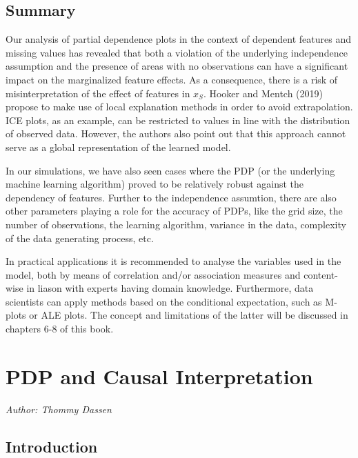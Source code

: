 \documentclass[
]{krantz}
\begin{document}
\hypertarget{summary}{%
\section{Summary}\label{summary}}

Our analysis of partial dependence plots in the context of dependent features and missing values has revealed that both a violation of the underlying independence assumption and the presence of areas with no observations can have a significant impact on the marginalized feature effects. As a consequence, there is a risk of misinterpretation of the effect of features in \(x_S\). Hooker and Mentch (2019) propose to make use of local explanation methods in order to avoid extrapolation. ICE plots, as an example, can be restricted to values in line with the distribution of observed data. However, the authors also point out that this approach cannot serve as a global representation of the learned model.\citep{2019arXiv190503151H}

In our simulations, we have also seen cases where the PDP (or the underlying machine learning algorithm) proved to be relatively robust against the dependency of features. Further to the independence assumtion, there are also other parameters playing a role for the accuracy of PDPs, like the grid size, the number of observations, the learning algorithm, variance in the data, complexity of the data generating process, etc.

In practical applications it is recommended to analyse the variables used in the model, both by means of correlation and/or association measures and content-wise in liason with experts having domain knowledge. Furthermore, data scientists can apply methods based on the conditional expectation, such as M-plots or ALE plots. The concept and limitations of the latter will be discussed in chapters 6-8 of this book.

\hypertarget{pdp-and-causal-interpretation}{%
\chapter{PDP and Causal Interpretation}\label{pdp-and-causal-interpretation}}

\emph{Author: Thommy Dassen}

\hypertarget{introduction-1}{%
\section{Introduction}\label{introduction-1}}
\end{document}

